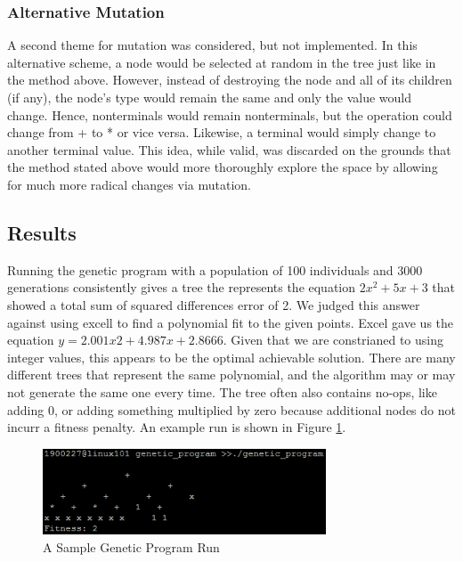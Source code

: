 \subsubsection{Alternative Mutation}

A second theme for mutation was considered, but not implemented. In this alternative scheme, a node would be selected at random in the tree just like in the method above. However, instead of destroying the node and all of its children (if any), the node's type would remain the same and only the value would change. Hence, nonterminals would remain nonterminals, but the operation could change from + to * or vice versa. Likewise, a terminal would simply change to another terminal value. This idea, while valid, was discarded on the grounds that the method stated above would more thoroughly explore the space by allowing for much more radical changes via mutation.

\subsection{Results}

Running the genetic program with a population of 100 individuals and 3000 generations consistently gives a tree the represents the equation $2x^2 + 5x + 3$ that showed a total sum of squared differences error of 2. We judged this answer against using excell to find a polynomial fit to the given points. Excel gave us the equation $y = 2.001x2 + 4.987x + 2.8666$. Given that we are constrianed to using integer values, this appears to be the optimal achievable solution. There are many different trees that represent the same polynomial, and the algorithm may or may not generate the same one every time. The tree often also contains no-ops, like adding 0, or adding something multiplied by zero because additional nodes do not incurr a fitness penalty. An example run is shown in Figure \ref{fig:gprun}.

\begin{figure}[tbh]
\begin{center}
\includegraphics[width=0.75\textwidth]{gprun.png}
\end{center}
\caption{A Sample Genetic Program Run\label{fig:gprun}}
\end{figure}

